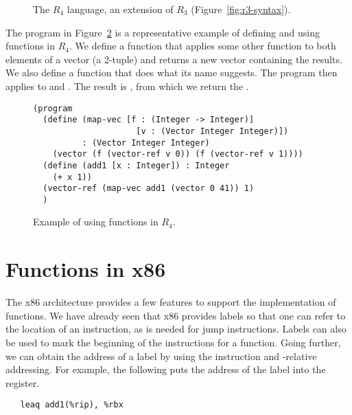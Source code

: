 \documentclass[11pt]{book}
\begin{document}
\begin{figure}[tbp]
\centering
{}
\caption{The $R_4$ language, an extension of $R_3$
  (Figure~\ref{fig:r3-syntax}).}
\label{fig:r4-syntax}
\end{figure}

The program in Figure~\ref{fig:r4-function-example} is a
representative example of defining and using functions in $R_4$.  We
define a function  that applies some other function
 to both elements of a vector (a 2-tuple) and returns a new
vector containing the results. We also define a function 
that does what its name suggests. The program then applies
 to  and .  The result is
, from which we return the .

\begin{figure}[tbp]
\begin{lstlisting}
(program
  (define (map-vec [f : (Integer -> Integer)]
                     [v : (Vector Integer Integer)])
          : (Vector Integer Integer)
    (vector (f (vector-ref v 0)) (f (vector-ref v 1))))
  (define (add1 [x : Integer]) : Integer
    (+ x 1))
  (vector-ref (map-vec add1 (vector 0 41)) 1)
  )
\end{lstlisting}
\caption{Example of using functions in $R_4$.}
\label{fig:r4-function-example}
\end{figure}



\section{Functions in x86}
\label{sec:fun-x86}

The x86 architecture provides a few features to support the
implementation of functions. We have already seen that x86 provides
labels so that one can refer to the location of an instruction, as is
needed for jump instructions. Labels can also be used to mark the
beginning of the instructions for a function.  Going further, we can
obtain the address of a label by using the  instruction and
-relative addressing. For example, the following puts the
address of the  label into the  register.
\begin{lstlisting}
   leaq add1(%rip), %rbx
\end{lstlisting}
\end{document}
